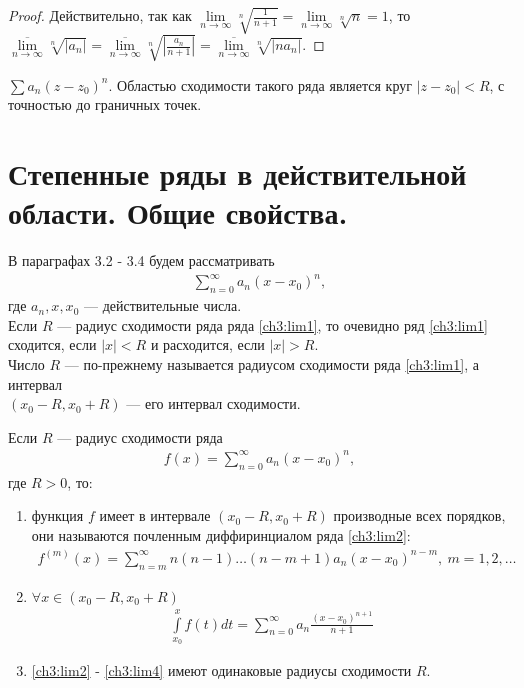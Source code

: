 \begin{proof}
  Действительно, так как $\lim\limits_{n \to \infty} \sqrt[n]{\frac{1}{n + 1}}=
  \lim\limits_{n \to \infty} \sqrt[n]{n} = 1$, то \\
  $\overline{\lim\limits_{n \to \infty}} \sqrt[n]{|a_n|} =
  \overline{\lim\limits_{n \to \infty}} \sqrt[n]{\left|\frac{a_n}{n + 1}\right|}=
  \overline{\lim\limits_{n \to \infty}} \sqrt[n]{|n a_n|}$.
\end{proof}

\begin{example}
  $\sum a_n (z - z_0)^n$.
  Областью сходимости такого ряда является круг $|z - z_0| < R$, с точностью до
  граничных точек.
\end{example}

\section{Степенные ряды в действительной области. Общие свойства.}
В параграфах 3.2 - 3.4 будем рассматривать
\begin{gather}
  \sum\limits_{n = 0}^{\infty} a_n (x - x_0)^n,
  \label{ch3:lim1}
\end{gather}
где $a_n, x, x_0$ --- действительные числа. \\
Если $R$ --- радиус сходимости ряда ряда \eqref{ch3:lim1}, то очевидно ряд
\eqref{ch3:lim1} сходится, если $|x| < R$ и расходится, если $|x| > R$. \\
Число $R$ --- по-прежнему называется радиусом сходимости ряда \eqref{ch3:lim1},
а интервал \\ $(x_0 - R, x_0 + R)$ --- его интервал сходимости.

\begin{theorem}
  \label{th321}
  Если $R$ --- радиус сходимости ряда
  \begin{gather}
    f(x) = \sum\limits_{n = 0}^{\infty} a_n (x - x_0)^n,
    \label{ch3:lim2}
  \end{gather}
  где $R > 0$, то:
  \begin{enumerate}
    \item функция $f$ имеет в интервале $(x_0 - R, x_0 + R)$ производные всех
      порядков, они называются почленным диффиринциалом ряда \eqref{ch3:lim2}:
      \begin{gather}
        f^{(m)}(x) = \sum\limits_{n = m}^{\infty} n(n-1)\dots(n - m + 1)
        a_n(x - x_0)^{n-m}, \ m = 1, 2, \dots
        \label{ch3:lim3}
      \end{gather}
    \item $\forall x \in (x_0 - R, x_0 + R)$
      \begin{gather}
        \int\limits_{x_0}^x f(t) dt = \sum\limits_{n = 0}^{\infty} a_n
        \frac{(x - x_0)^{n+1}}{n+1}
        \label{ch3:lim4}
      \end{gather}
    \item \eqref{ch3:lim2} - \eqref{ch3:lim4} имеют одинаковые радиусы сходимости
      $R$.
  \end{enumerate}
\end{theorem}

